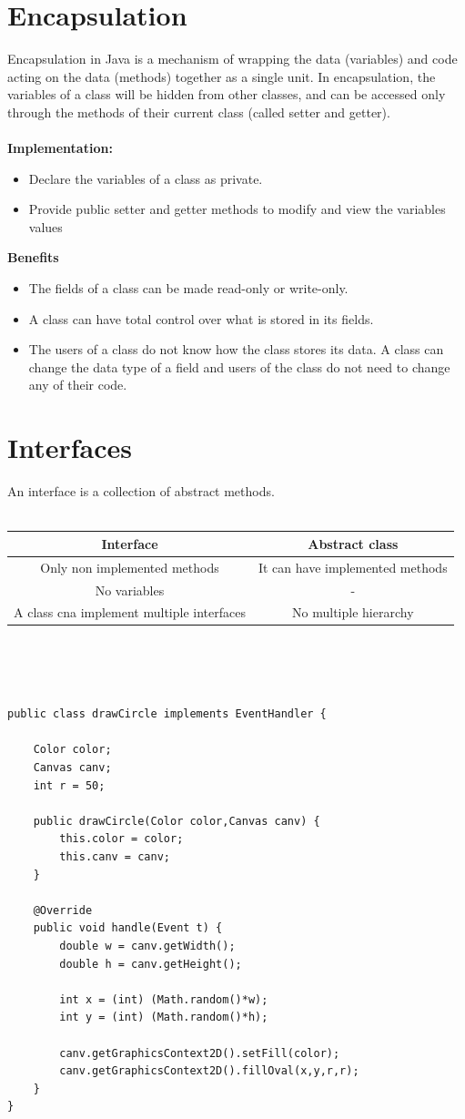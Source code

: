 \documentclass[10pt,a4paper]{book}
\begin{document}
\section{Encapsulation}
Encapsulation in Java is a mechanism of wrapping the data (variables) and code acting on the data (methods) together as a single unit. In encapsulation, the variables of a class will be hidden from other classes, and can be accessed only through the methods of their current class (called setter and getter).\\\\
\textbf{Implementation:}
\begin{itemize}
\item Declare the variables of a class as private.
\item Provide public setter and getter methods to modify and view the variables values
\end{itemize} 
\textbf{Benefits}
\begin{itemize}
\item The fields of a class can be made read-only or write-only.
\item A class can have total control over what is stored in its fields.
\item The users of a class do not know how the class stores its data. A class can change the data type of a field and users of the class do not need to change any of their code.
\end{itemize}
\newpage
\section{Interfaces}
An interface is a collection of abstract methods.\\\\
\begin{tabular}{|c|c|}
\hline 
Interface & Abstract class \\ 
\hline 
Only non implemented methods & It can have implemented methods\\
No variables & -\\
A class cna implement multiple interfaces & No multiple hierarchy\\
\hline 
\end{tabular} 
\\\\\\
\begin{verbatim}
public class drawCircle implements EventHandler {

    Color color;
    Canvas canv;
    int r = 50;
    
    public drawCircle(Color color,Canvas canv) {
        this.color = color;
        this.canv = canv;
    }
    
    @Override
    public void handle(Event t) {
        double w = canv.getWidth();
        double h = canv.getHeight();
        
        int x = (int) (Math.random()*w);
        int y = (int) (Math.random()*h);
        
        canv.getGraphicsContext2D().setFill(color);
        canv.getGraphicsContext2D().fillOval(x,y,r,r);
    }
} 

\end{verbatim}
\newpage
\end{document}
